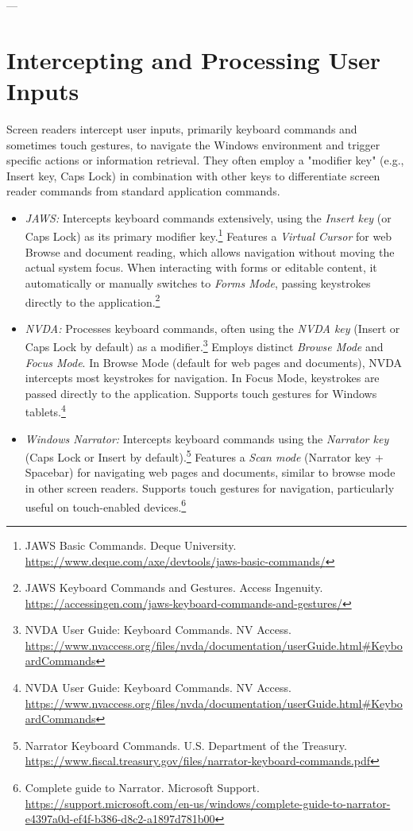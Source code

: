 ---

\section{Intercepting and Processing User Inputs}
\label{sec:intercepting-inputs}

Screen readers intercept user inputs, primarily keyboard commands and sometimes touch gestures, to navigate the Windows environment and trigger specific actions or information retrieval. They often employ a "modifier key" (e.g., Insert key, Caps Lock) in combination with other keys to differentiate screen reader commands from standard application commands.

\begin{itemize}
    \item \emph{JAWS:} Intercepts keyboard commands extensively, using the \emph{Insert key} (or Caps Lock) as its primary modifier key.\footnote{JAWS Basic Commands. Deque University. \url{https://www.deque.com/axe/devtools/jaws-basic-commands/}} Features a \emph{Virtual Cursor} for web Browse and document reading, which allows navigation without moving the actual system focus. When interacting with forms or editable content, it automatically or manually switches to \emph{Forms Mode}, passing keystrokes directly to the application.\footnote{JAWS Keyboard Commands and Gestures. Access Ingenuity. \url{https://accessingen.com/jaws-keyboard-commands-and-gestures/}}
    \item \emph{NVDA:} Processes keyboard commands, often using the \emph{NVDA key} (Insert or Caps Lock by default) as a modifier.\footnote{NVDA User Guide: Keyboard Commands. NV Access. \url{https://www.nvaccess.org/files/nvda/documentation/userGuide.html\#KeyboardCommands}} Employs distinct \emph{Browse Mode} and \emph{Focus Mode}. In Browse Mode (default for web pages and documents), NVDA intercepts most keystrokes for navigation. In Focus Mode, keystrokes are passed directly to the application. Supports touch gestures for Windows tablets.\footnote{NVDA User Guide: Keyboard Commands. NV Access. \url{https://www.nvaccess.org/files/nvda/documentation/userGuide.html\#KeyboardCommands}}
    \item \emph{Windows Narrator:} Intercepts keyboard commands using the \emph{Narrator key} (Caps Lock or Insert by default).\footnote{Narrator Keyboard Commands. U.S. Department of the Treasury. \url{https://www.fiscal.treasury.gov/files/narrator-keyboard-commands.pdf}} Features a \emph{Scan mode} (Narrator key + Spacebar) for navigating web pages and documents, similar to browse mode in other screen readers. Supports touch gestures for navigation, particularly useful on touch-enabled devices.\footnote{Complete guide to Narrator. Microsoft Support. \url{https://support.microsoft.com/en-us/windows/complete-guide-to-narrator-e4397a0d-ef4f-b386-d8c2-a1897d781b00}}

\end{itemize}
